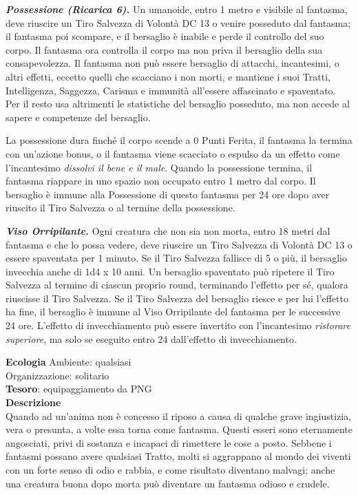 \begin{multicols}{2}
\textit{\textbf{Possessione (Ricarica 6).}} Un umanoide, entro 1 metro e visibile al fantasma, deve riuscire un Tiro Salvezza di Volontà DC 13 o venire posseduto dal fantasma; il fantasma poi scompare, e il bersaglio è inabile e perde il controllo del suo corpo. Il fantasma ora controlla il corpo ma non priva il bersaglio della sua consapevolezza. Il fantasma non può essere bersaglio di attacchi, incantesimi, o altri effetti, eccetto quelli che scacciano i non morti, e mantiene i suoi Tratti, Intelligenza, Saggezza, Carisma e immunità all'essere affascinato e spaventato. Per il resto usa altrimenti le statistiche del bersaglio posseduto, ma non accede al sapere e competenze del bersaglio.

La possessione dura finché il corpo scende a 0 Punti Ferita, il fantasma la termina con un'azione bonus, o il fantasma viene scacciato o espulso da un effetto come l'incantesimo \textit{dissolvi il bene e il male}. Quando la possessione termina, il fantasma riappare in uno spazio non occupato entro 1 metro dal corpo. Il bersaglio è immune alla Possessione di questo fantasma per 24 ore dopo aver riuscito il Tiro Salvezza o al termine della possessione.

\textit{\textbf{Viso Orripilante.}} Ogni creatura che non sia non morta, entro 18 metri dal fantasma e che lo possa vedere, deve riuscire un Tiro Salvezza di Volontà DC 13 o essere spaventata per 1 minuto. Se il Tiro Salvezza fallisce di 5 o più, il bersaglio invecchia anche di 1d4 x 10 anni. Un bersaglio spaventato può ripetere il Tiro Salvezza al termine di ciascun proprio round, terminando l'effetto per sé, qualora riuscisse il Tiro Salvezza. Se il Tiro Salvezza del bersaglio riesce e per lui l'effetto ha fine, il bersaglio è immune al Viso Orripilante del fantasma per le successive 24 ore. L'effetto di invecchiamento può essere invertito con l'incantesimo \textit{ristorare superiore}, ma solo se eseguito entro 24 dall'effetto di invecchiamento.

\textbf{Ecologia}
Ambiente: qualsiasi\\
Organizzazione: solitario\\
\textbf{Tesoro}: equipaggiamento da PNG\\
\textbf{Descrizione}\\
Quando ad un'anima non è concesso il riposo a causa di qualche grave ingiustizia, vera o presunta, a volte essa torna come fantasma. Questi esseri sono eternamente angosciati, privi di sostanza e incapaci di rimettere le cose a posto. Sebbene i fantasmi possano avere qualsiasi Tratto, molti si aggrappano al mondo dei viventi con un forte senso di odio e rabbia, e come risultato diventano malvagi; anche una creatura buona dopo morta può diventare un fantasma odioso e crudele.\\


\end{multicols}
